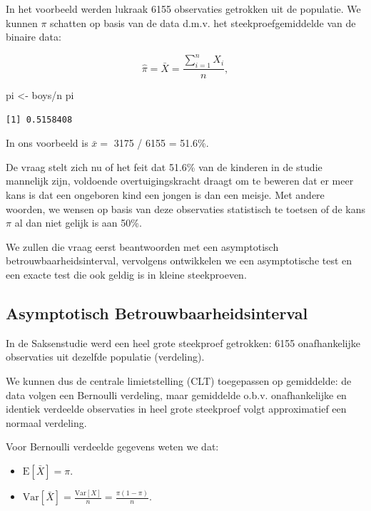 \documentclass[
  dutch,
  letterpaper,
  12pt]{book}
\newenvironment{Shaded}{\begin{snugshade}}{\end{snugshade}}
\newcommand{\NormalTok}[1]{\textcolor[rgb]{0.00,0.23,0.31}{#1}}
\newcommand{\OtherTok}[1]{\textcolor[rgb]{0.00,0.23,0.31}{#1}}
\newcommand{\SpecialCharTok}[1]{\textcolor[rgb]{0.37,0.37,0.37}{#1}}
\providecommand{\tightlist}{%
  \setlength{\itemsep}{0pt}\setlength{\parskip}{0pt}}
\theoremstyle{definition}
\theoremstyle{definition}
\theoremstyle{definition}
\theoremstyle{remark}
\begin{document}
In het voorbeeld werden lukraak 6155 observaties getrokken uit de
populatie. We kunnen \(\pi\) schatten op basis van de data d.m.v. het
steekproefgemiddelde van de binaire data:

\[\hat \pi = \bar X = \frac{\sum\limits_{i=1}^n X_i}{n},\]

\begin{Shaded}
\begin{Highlighting}[]
\NormalTok{pi }\OtherTok{\textless{}{-}}\NormalTok{ boys}\SpecialCharTok{/}\NormalTok{n}
\NormalTok{pi}
\end{Highlighting}
\end{Shaded}

\begin{verbatim}
[1] 0.5158408
\end{verbatim}

In ons voorbeeld is \(\bar x =\) 3175 / 6155 = 51.6\%.

De vraag stelt zich nu of het feit dat 51.6\% van de kinderen in de
studie mannelijk zijn, voldoende overtuigingskracht draagt om te beweren
dat er meer kans is dat een ongeboren kind een jongen is dan een meisje.
Met andere woorden, we wensen op basis van deze observaties statistisch
te toetsen of de kans \(\pi\) al dan niet gelijk is aan 50\%.

We zullen die vraag eerst beantwoorden met een asymptotisch
betrouwbaarheidsinterval, vervolgens ontwikkelen we een asymptotische
test en een exacte test die ook geldig is in kleine steekproeven.

\subsection{Asymptotisch
Betrouwbaarheidsinterval}\label{asymptotisch-betrouwbaarheidsinterval}

In de Saksenstudie werd een heel grote steekproef getrokken: 6155
onafhankelijke observaties uit dezelfde populatie (verdeling).

We kunnen dus de centrale limietstelling (CLT) toegepassen op
gemiddelde: de data volgen een Bernoulli verdeling, maar gemiddelde
o.b.v. onafhankelijke en identiek verdeelde observaties in heel grote
steekproef volgt approximatief een normaal verdeling.

Voor Bernoulli verdeelde gegevens weten we dat:

\begin{itemize}
\tightlist
\item
  \(\text{E}[\bar X] = \pi\).
\item
  \(\text{Var}[\bar X] = \frac{\text{Var}[X]}{n} = \frac{\pi(1-\pi)}{n}\).
\end{itemize}
\end{document}
